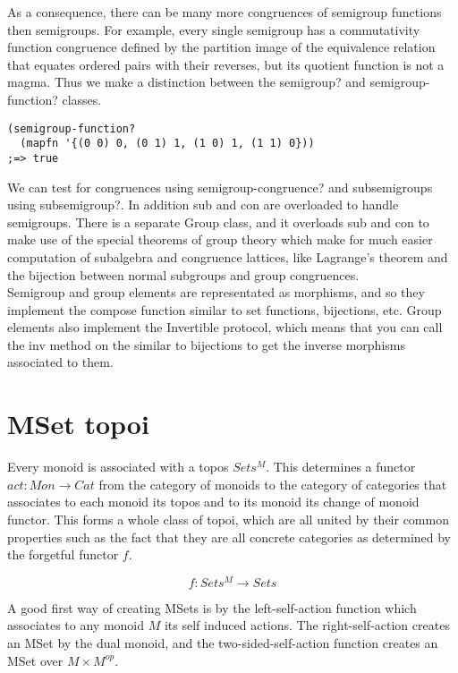 \documentclass[a4paper,11pt]{report}
\begin{document}
As a consequence, there can be many more congruences of semigroup functions then semigroups. For example, every single semigroup has a commutativity function congruence defined by the partition image of the equivalence relation that equates ordered pairs with their reverses, but its quotient function is not a magma. Thus we make a distinction between the semigroup? and semigroup-function? classes.

\lstset {language=Lisp}
\begin{lstlisting}
(semigroup-function? 
  (mapfn '{(0 0) 0, (0 1) 1, (1 0) 1, (1 1) 0}))
;=> true
\end{lstlisting}

We can test for congruences using semigroup-congruence? and subsemigroups using subsemigroup?. In addition sub and con are overloaded to handle semigroups. There is a separate Group class, and it overloads sub and con to make use of the special theorems of group theory which make for much easier computation of subalgebra and congruence lattices, like Lagrange's theorem and the bijection between normal subgroups and group congruences. \\

Semigroup and group elements are representated as morphisms, and so they implement the compose function similar to set functions, bijections, etc. Group elements also implement the Invertible protocol, which means that you can call the inv method on the similar to bijections to get the inverse morphisms associated to them.

\newpage 

\section{MSet topoi}
Every monoid is associated with a topos $Sets^M$. This determines a functor $act : Mon \to Cat$ from the category of monoids to the category of categories that associates to each monoid its topos and to its monoid its change of monoid functor. This forms a whole class of topoi, which are all united by their common properties such as the fact that they are all concrete categories as determined by the forgetful functor $f$. 

\[ f : Sets^M \to Sets \]

A good first way of creating MSets is by the left-self-action function which associates to any monoid $M$ its self induced actions. The right-self-action creates an MSet by the dual monoid, and the two-sided-self-action function creates an MSet over $M \times M^{op}$.
\end{document}
